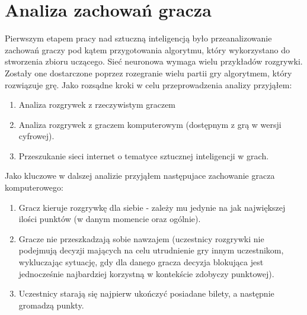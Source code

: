 \documentclass[12pt, oneside]{report}
\begin{document}
	\section{Analiza zachowań gracza}
	Pierwszym etapem pracy nad sztuczną inteligencją było przeanalizowanie zachowań graczy pod kątem przygotowania algorytmu, który wykorzystano do stworzenia zbioru uczącego. Sieć neuronowa wymaga wielu przykładów rozgrywki. Zostały one dostarczone poprzez rozegranie wielu partii gry algorytmem, który rozwiązuje grę. Jako rozsądne kroki w celu przeprowadzenia analizy przyjąłem:
	\begin{enumerate}
		\item{Analiza rozgrywek z rzeczywistym graczem}
		\item{Analiza rozgrywek z graczem komputerowym (dostępnym z grą w wersji cyfrowej)}.
		\item{Przeszukanie sieci internet o tematyce sztucznej inteligencji w grach}. 
	\end{enumerate}
	Jako kluczowe w dalszej analizie przyjąłem następujace zachowanie gracza komputerowego:
	\begin{enumerate}
		\item Gracz kieruje rozgrywkę dla siebie - zależy mu jedynie na jak największej ilości punktów (w danym momencie oraz ogólnie).
		\item Gracze nie przeszkadzają sobie nawzajem (uczestnicy rozgrywki nie podejmują decyzji mających na celu utrudnienie gry innym uczestnikom, wykluczając sytuację, gdy dla danego gracza decyzja blokująca jest jednocześnie najbardziej korzystną w kontekście zdobyczy punktowej).
		\item Uczestnicy starają się najpierw ukończyć posiadane bilety, a następnie gromadzą punkty.
	\end{enumerate}
\end{document}
